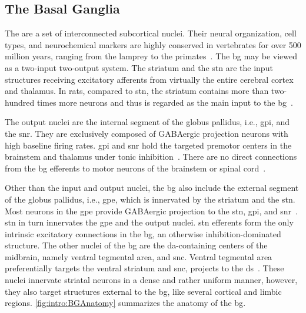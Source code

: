 \subsection{The Basal Ganglia}
\label{intro:BGAnatomy}
The  are a set of interconnected subcortical nuclei.
Their neural organization, cell types, and neurochemical markers are highly conserved in vertebrates for over 500 million years, ranging from the lamprey to the primates~\cite{Grillner2016BG}.
The \gls{bg} may be viewed as a two-input two-output system.
The striatum and the \gls{stn} are the input structures receiving excitatory afferents from virtually the entire cerebral cortex and thalamus.
In rats, compared to \gls{stn}, the striatum contains more than two-hundred times more neurons and thus is regarded as the main input to the \gls{bg}~\cite{Oorschot1996}.
\par
The output nuclei are the internal segment of the globus pallidus, i.e., \gls{gpi}, and the \gls{snr}.
They are exclusively composed of GABAergic projection neurons with high baseline firing rates.
\Gls{gpi} and \gls{snr} hold the targeted premotor centers in the brainstem and thalamus under tonic inhibition~\cite{Redgrave2010}.
There are no direct connections from the \gls{bg} efferents to motor neurons of the brainstem or spinal cord~\cite{Mink1996}.
\par
Other than the input and output nuclei, the \gls{bg} also include the external segment of the globus pallidus, i.e., \gls{gpe}, which is innervated by the striatum and the \gls{stn}.
Most neurons in the \gls{gpe} provide GABAergic projection to the \gls{stn}, \gls{gpi}, and \gls{snr}~\cite{Dudman2015Book}.
\Gls{stn} in turn innervates the \gls{gpe} and the output nuclei.
\Gls{stn} efferents form the only intrinsic excitatory connections in the \gls{bg}, an otherwise inhibition-dominated structure.
The other nuclei of the \gls{bg} are the \gls{da}-containing centers of the midbrain, namely ventral tegmental area, and \gls{snc}.
Ventral tegmental area preferentially targets the ventral striatum and \gls{snc}, projects to the \gls{ds}~\cite{Cox2019NatRevNeurosci}.
These nuclei innervate striatal neurons in a dense and rather uniform manner, however, they also target structures external to the \gls{bg}, like several cortical and limbic regions.
\autoref{fig:intro:BGAnatomy} summarizes the anatomy of the \gls{bg}.




